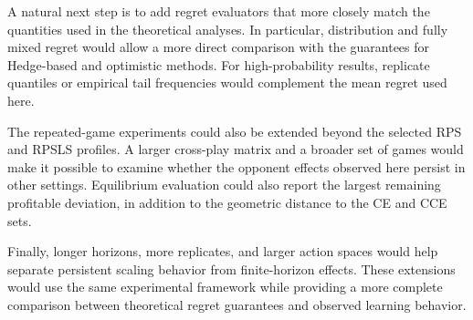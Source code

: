 A natural next step is to add regret evaluators that more closely match the
quantities used in the theoretical analyses. In particular, distribution and
fully mixed regret would allow a more direct comparison with the guarantees
for Hedge-based and optimistic methods. For high-probability results, replicate
quantiles or empirical tail frequencies would complement the mean regret used
here.

The repeated-game experiments could also be extended beyond the selected RPS
and RPSLS profiles. A larger cross-play matrix and a broader set of games would
make it possible to examine whether the opponent effects observed here persist
in other settings. Equilibrium evaluation could also report the largest remaining
profitable deviation, in addition to the geometric distance to the CE and CCE sets.

Finally, longer horizons, more replicates, and larger action spaces would help
separate persistent scaling behavior from finite-horizon effects. These
extensions would use the same experimental framework while providing a more
complete comparison between theoretical regret guarantees and observed
learning behavior.
